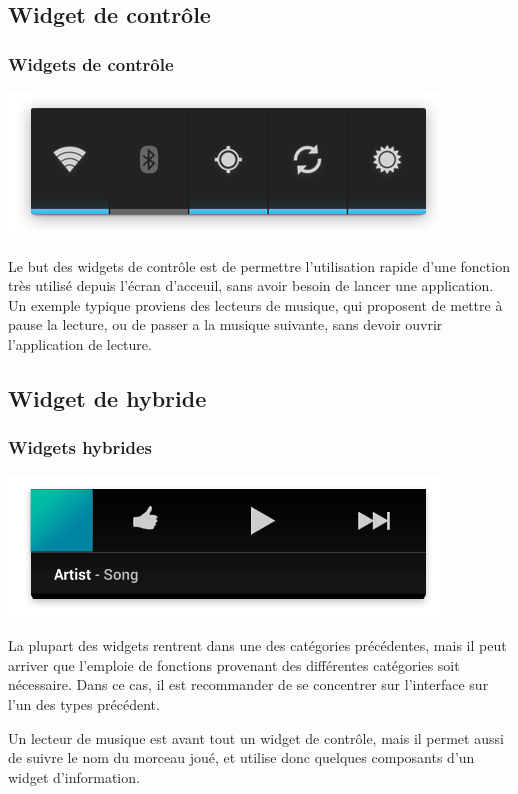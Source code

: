 \documentclass{beamer}
\begin{document}
\subsection{Widget de contrôle}
\begin{frame}
\frametitle{Widgets de contrôle}
\begin{center}
\includegraphics[scale=0.4]{widgets_control.png}
\end{center}

Le but des widgets de contrôle est de permettre l'utilisation rapide d'une fonction très utilisé depuis l'écran d'acceuil, sans avoir besoin de lancer une application. Un exemple typique proviens des lecteurs de musique, qui proposent de mettre à pause la lecture, ou de passer a la musique suivante, sans devoir ouvrir l'application de lecture.
\end{frame}

\subsection{Widget de hybride}
\begin{frame}
\frametitle{Widgets hybrides}
\begin{center}
\includegraphics[scale=0.3]{widgets_hybrid.png}
\end{center}

La plupart des widgets rentrent dans une des catégories précédentes, mais il peut arriver que l’emploie de fonctions provenant des différentes catégories soit nécessaire. Dans ce cas, il est recommander de se concentrer sur l'interface sur l'un des types précédent.

\begin{exampleblock}{Un lecteur de musique}
est avant tout un widget de contrôle, mais il permet aussi de suivre le nom du morceau joué, et utilise donc quelques composants d'un widget d'information.
\end{exampleblock}
\end{frame}
\end{document}
